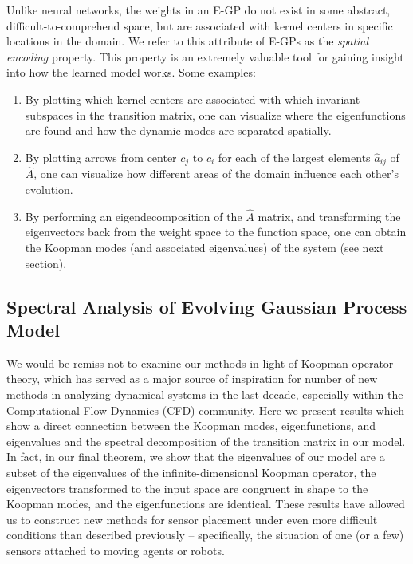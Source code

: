 \documentclass[letterpaper,12pt,peerreviewca,draftcls]{IEEEtran}
\newcommand{\dualop}{A}
\newcommand{\dualopApprox}{\widehat{\dualop}}
\begin{document}
Unlike neural networks, the weights in an E-GP do not exist in some abstract, difficult-to-comprehend space, but are associated with kernel centers in specific locations in the domain. We refer to this attribute of E-GPs as the \emph{spatial encoding} property. This property is an extremely valuable tool for gaining insight into how the learned model works. Some examples:
\begin{enumerate}
	\item By plotting which kernel centers are associated with which invariant subspaces in the transition matrix, one can visualize where the eigenfunctions are found and how the dynamic modes are separated spatially.
	\item By plotting arrows from center $c_j$ to $c_i$ for each of the largest elements $\hat a_{ij}$ of $\dualopApprox$, one can visualize how different areas of the domain influence each other's evolution.
	\item By performing an eigendecomposition of the $\dualopApprox$ matrix, and transforming the eigenvectors back from the weight space to the function space, one can obtain the Koopman modes (and associated eigenvalues) of the system (see next section).
\end{enumerate}


\subsection{Spectral Analysis of Evolving Gaussian Process Model}

We would be remiss not to examine our methods in light of Koopman operator theory, which has served as a major source of inspiration for number of new methods in analyzing dynamical systems in the last decade, especially within the Computational Flow Dynamics (CFD) community. Here we present results which show a direct connection between the Koopman modes, eigenfunctions, and eigenvalues and the spectral decomposition of the transition matrix in our model. In fact, in our final theorem, we show that the eigenvalues of our model are a subset of the eigenvalues of the infinite-dimensional Koopman operator, the eigenvectors transformed to the input space are congruent in shape to the Koopman modes, and the eigenfunctions are identical. These results have allowed us to construct new methods for sensor placement under even more difficult conditions than described previously -- specifically, the situation of one (or a few) sensors attached to moving agents or robots.
\end{document}
